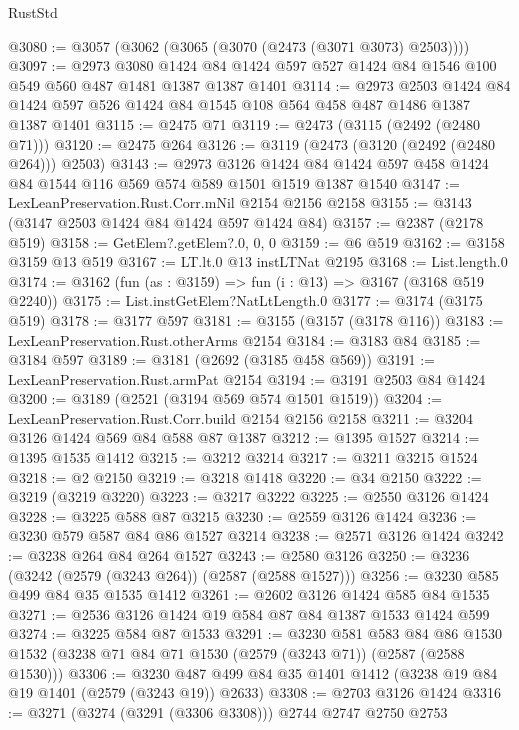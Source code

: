\begin{lexlean}{RustStd}
\begin{coremodule}
{\begin{coremodule}
{{{{{{{{{{@3080 := @3057 (@3062 (@3065 (@3070 (@2473 (@3071 @3073) @2503))))
@3097 := @2973
    @3080
    @1424
    @84
    @1424
    @597
    @527
    @1424
    @84
    @1546
    @100
    @549
    @560
    @487
    @1481
    @1387
    @1387
    @1401
@3114 := @2973
    @2503
    @1424
    @84
    @1424
    @597
    @526
    @1424
    @84
    @1545
    @108
    @564
    @458
    @487
    @1486
    @1387
    @1387
    @1401
@3115 := @2475 @71
@3119 := @2473 (@3115 (@2492 (@2480 @71)))
@3120 := @2475 @264
@3126 := @3119 (@2473 (@3120 (@2492 (@2480 @264))) @2503)
@3143 := @2973
    @3126
    @1424
    @84
    @1424
    @597
    @458
    @1424
    @84
    @1544
    @116
    @569
    @574
    @589
    @1501
    @1519
    @1387
    @1540
@3147 := LexLeanPreservation.Rust.Corr.mNil @2154 @2156 @2158
@3155 := @3143 (@3147 @2503 @1424 @84 @1424 @597 @1424 @84)
@3157 := @2387 (@2178 @519)
@3158 := GetElem?.getElem?.{0, 0, 0}
@3159 := @6 @519
@3162 := @3158 @3159 @13 @519
@3167 := LT.lt.{0} @13 instLTNat @2195
@3168 := List.length.{0}
@3174 := @3162 (fun (as : @3159) => fun (i : @13) => @3167 (@3168 @519 @2240))
@3175 := List.instGetElem?NatLtLength.{0}
@3177 := @3174 (@3175 @519)
@3178 := @3177 @597
@3181 := @3155 (@3157 (@3178 @116))
@3183 := LexLeanPreservation.Rust.otherArms @2154
@3184 := @3183 @84
@3185 := @3184 @597
@3189 := @3181 (@2692 (@3185 @458 @569))
@3191 := LexLeanPreservation.Rust.armPat @2154
@3194 := @3191 @2503 @84 @1424
@3200 := @3189 (@2521 (@3194 @569 @574 @1501 @1519))
@3204 := LexLeanPreservation.Rust.Corr.build @2154 @2156 @2158
@3211 := @3204 @3126 @1424 @569 @84 @588 @87 @1387
@3212 := @1395 @1527
@3214 := @1395 @1535 @1412
@3215 := @3212 @3214
@3217 := @3211 @3215 @1524
@3218 := @2 @2150
@3219 := @3218 @1418
@3220 := @34 @2150
@3222 := @3219 (@3219 @3220)
@3223 := @3217 @3222
@3225 := @2550 @3126 @1424
@3228 := @3225 @588 @87 @3215
@3230 := @2559 @3126 @1424
@3236 := @3230 @579 @587 @84 @86 @1527 @3214
@3238 := @2571 @3126 @1424
@3242 := @3238 @264 @84 @264 @1527
@3243 := @2580 @3126
@3250 := @3236 (@3242 (@2579 (@3243 @264)) (@2587 (@2588 @1527)))
@3256 := @3230 @585 @499 @84 @35 @1535 @1412
@3261 := @2602 @3126 @1424 @585 @84 @1535
@3271 := @2536 @3126 @1424 @19 @584 @87 @84 @1387 @1533 @1424 @599
@3274 := @3225 @584 @87 @1533
@3291 := @3230
    @581
    @583
    @84
    @86
    @1530
    @1532
    (@3238 @71 @84 @71 @1530 (@2579 (@3243 @71)) (@2587 (@2588 @1530)))
@3306 := @3230 @487 @499 @84 @35 @1401 @1412 (@3238 @19 @84 @19 @1401 (@2579 (@3243 @19)) @2633)
@3308 := @2703 @3126 @1424
@3316 := @3271 (@3274 (@3291 (@3306 @3308))) @2744 @2747 @2750 @2753
}}}}}}}}}}
\end{coremodule}}
\end{coremodule}
\end{lexlean}
